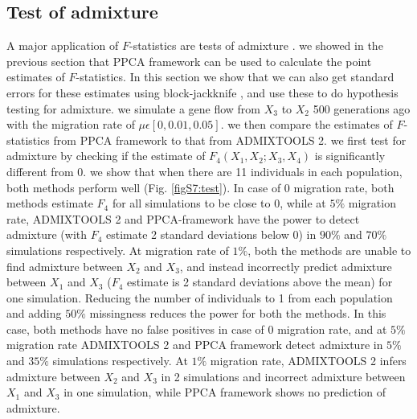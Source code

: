 \documentclass[12pt]{article}
\begin{document}
\subsection{Test of admixture}
A major application of $F$-statistics are tests of admixture \citep{orlando_ancient_2021}. we showed in the previous section that PPCA framework can be used to calculate the point estimates of $F$-statistics. In this section we show that we can also get standard errors for these estimates using block-jackknife \citep{kunsch_jackknife_1989,maier_limits_2022, patterson_modication_2020}, and use these to do hypothesis testing for admixture. we simulate a gene flow from $X_3$ to $X_2$ 500 generations ago with the migration rate of $\mu \epsilon [0, 0.01, 0.05]$. we then compare the estimates of $F$-statistics from PPCA framework to that from ADMIXTOOLS 2. we first test for admixture by checking if the estimate of $F_4(X_1,X_2;X_3,X_4)$ is significantly different from 0. we show that when there are 11 individuals in each population, both methods perform well (Fig. \ref{figS7:test}). In case of 0 migration rate, both methods estimate $F_4$ for all simulations to be close to 0, while at $5\%$ migration rate, ADMIXTOOLS 2 and PPCA-framework have the power to detect admixture (with $F_4$ estimate 2 standard deviations below 0) in $90\%$ and $70\%$ simulations respectively. At migration rate of $1\%$, both the methods are unable to find admixture between $X_2$ and $X_3$, and instead incorrectly predict admixture between $X_1$ and $X_3$ ($F_4$ estimate is 2 standard deviations above the mean) for one simulation. Reducing the number of individuals to 1 from each population and adding $50\%$ missingness reduces the power for both the methods. In this case, both methods have no false positives in case of 0 migration rate, and at $5\%$ migration rate ADMIXTOOLS 2 and PPCA framework detect admixture in $5\%$ and $35\%$ simulations respectively. At $1\%$ migration rate, ADMIXTOOLS 2 infers admixture between $X_2$ and $X_3$ in 2 simulations and incorrect admixture between $X_1$ and $X_3$ in one simulation, while PPCA framework shows no prediction of admixture.
\end{document}
